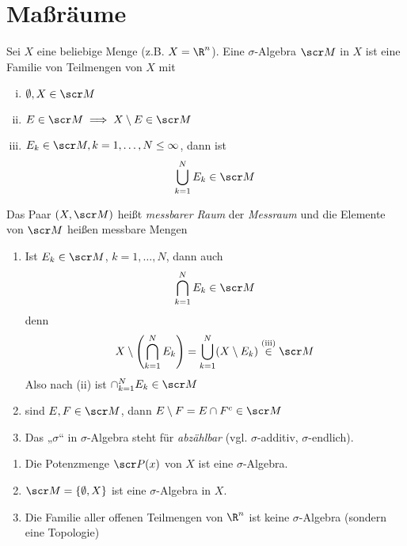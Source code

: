 \documentclass[a4paper,10pt]{scrbook}
\begin{document}
\section{Maßräume}


Sei $X$ eine beliebige Menge (z.B. $X=\R^n$).
Eine $\sigma$-Algebra $\scr M$ in $X$ ist eine Familie von Teilmengen von $X$ mit
\begin{enumerate}[(i)]
	\item
		$\emptyset, X \in \scr M$
	\item
		$E \in \scr M \implies X \setminus E \in \scr M$
	\item
		$E_k \in \scr M, k=1,\dotsc, N \le \infty$, dann ist
		\[
			\bigcup_{k=1}^N E_k \in \scr M
		\]
\end{enumerate}
Das Paar $(X,\scr M)$ heißt \emph{messbarer Raum} der \emph{Messraum} und die Elemente von $\scr M$ heißen messbare Mengen

\begin{note}
	\begin{enumerate}[1)]
		\item
			Ist $E_k \in \scr M$, $k=1,\dotsc, N$, dann auch
			\[
				\bigcap_{k=1}^N E_k \in \scr M
			\]
			denn
			\[
				X \setminus \left(\bigcap_{k=1}^N E_k\right) = \bigcup_{k=1}^N (X\setminus E_k) \stackrel{\text{(iii)}} \in \scr M
			\]
			Also nach (ii) ist $\cap_{k=1}^N E_k \in \scr M$
		\item
			sind $E, F \in \scr M$, dann $E \setminus F = E \cap F^c \in \scr M$
		\item
			Das „$\sigma$“ in $\sigma$-Algebra steht für \emph{abzählbar} (vgl. $\sigma$-additiv, $\sigma$-endlich).
	\end{enumerate}
\end{note}


\begin{ex*}
	\begin{enumerate}[1)]
		\item
			Die Potenzmenge $\scr P(x)$ von $X$ ist eine $\sigma$-Algebra.
		\item
			$\scr M = \{\emptyset, X\}$ ist eine $\sigma$-Algebra in $X$.
		\item
			Die Familie aller offenen Teilmengen von $\R^n$ ist keine $\sigma$-Algebra (sondern eine Topologie)
	\end{enumerate}
\end{ex*}
\end{document}
